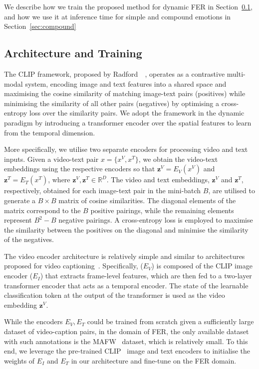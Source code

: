 \documentclass[10pt,twocolumn,letterpaper]{article}
\begin{document}
We describe how we train the proposed method for dynamic FER in Section~\ref{subsec:proposed}, and how we use it at inference time for simple and compound emotions in Section~\ref{sec:compound}

\subsection{Architecture and Training}
\label{subsec:proposed}
The CLIP framework, proposed by Radford~\etal~\cite{radford_CLIP_2021}, operates as a contrastive multi-modal system, encoding image and text features into a shared space and maximising the cosine similarity of matching image-text pairs (positives) while minimising the similarity of all other pairs (negatives) by optimising a cross-entropy loss over the similarity pairs. We adopt the framework in the dynamic paradigm by introducing a transformer encoder over the spatial features to learn from the temporal dimension.

More specifically, we utilise two separate encoders for processing video and text inputs. Given a video-text pair $x = \{x^V, x^T\}$, we obtain the video-text embeddings using the respective encoders so that $\textbf{z}^V = E_V(x^V)$ and $\textbf{z}^T = E_T(x^T)$, where $\textbf{z}^V, \textbf{z}^T \in \mathbb{R}^D$. The video and text embeddings, $\textbf{z}^V$ and $\textbf{z}^T$, respectively, obtained for each image-text pair in the mini-batch $B$, are utilised to generate a $B \times B$ matrix of cosine similarities. The diagonal elements of the matrix correspond to the $B$ positive pairings, while the remaining elements represent $B^2 - B$ negative pairings. A cross-entropy loss is employed to maximise the similarity between the positives on the diagonal and minimise the similarity of the negatives. 

The video encoder architecture is relatively simple and similar to architectures proposed for video captioning~\cite{ma_x-clip_2022, tang_clip4caption_2021}. Specifically, ($E_V$) is composed of the CLIP image encoder ($E_I$) that extracts frame-level features, which are then fed to a two-layer transformer encoder that acts as a temporal encoder. The state of the learnable classification token at the output of the transformer is used as the video embedding $\textbf{z}^V$. 

While the encoders $E_V, E_T$ could be trained from scratch given a sufficiently large dataset of video-caption pairs, in the domain of FER, the only available dataset with such annotations is the MAFW~\cite{liu_mafw_2022} dataset, which is relatively small. To this end, we leverage the pre-trained CLIP~\cite{radford_CLIP_2021} image and text encoders to initialise the weights of $E_I$ and $E_T$ in our architecture and fine-tune on the FER domain.
\end{document}
